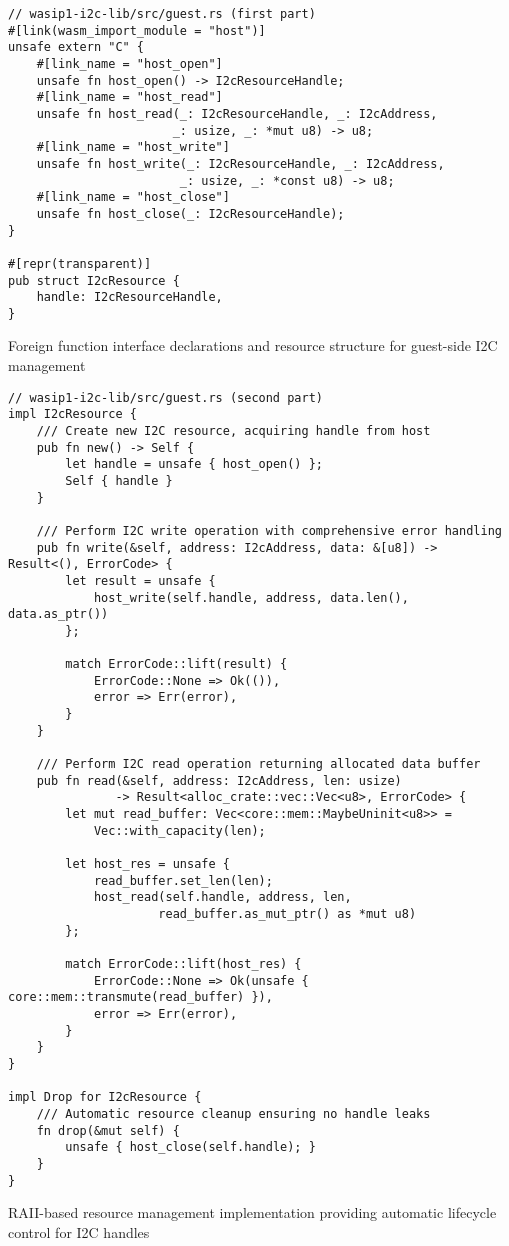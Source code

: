 \begin{listing}[H]
\begin{verbatim}
// wasip1-i2c-lib/src/guest.rs (first part)
#[link(wasm_import_module = "host")]
unsafe extern "C" {
    #[link_name = "host_open"]
    unsafe fn host_open() -> I2cResourceHandle;
    #[link_name = "host_read"]
    unsafe fn host_read(_: I2cResourceHandle, _: I2cAddress, 
                       _: usize, _: *mut u8) -> u8;
    #[link_name = "host_write"]
    unsafe fn host_write(_: I2cResourceHandle, _: I2cAddress, 
                        _: usize, _: *const u8) -> u8;
    #[link_name = "host_close"]
    unsafe fn host_close(_: I2cResourceHandle);
}

#[repr(transparent)]
pub struct I2cResource {
    handle: I2cResourceHandle,
}
\end{verbatim}
\caption{Foreign function interface declarations and resource structure for guest-side I2C management}
\label{lst:guest-ffi-declarations}
\end{listing}

\begin{listing}[H]
\begin{verbatim}
// wasip1-i2c-lib/src/guest.rs (second part)
impl I2cResource {
    /// Create new I2C resource, acquiring handle from host
    pub fn new() -> Self {
        let handle = unsafe { host_open() };
        Self { handle }
    }

    /// Perform I2C write operation with comprehensive error handling
    pub fn write(&self, address: I2cAddress, data: &[u8]) -> Result<(), ErrorCode> {
        let result = unsafe {
            host_write(self.handle, address, data.len(), data.as_ptr())
        };
        
        match ErrorCode::lift(result) {
            ErrorCode::None => Ok(()),
            error => Err(error),
        }
    }

    /// Perform I2C read operation returning allocated data buffer
    pub fn read(&self, address: I2cAddress, len: usize) 
               -> Result<alloc_crate::vec::Vec<u8>, ErrorCode> {
        let mut read_buffer: Vec<core::mem::MaybeUninit<u8>> = 
            Vec::with_capacity(len);

        let host_res = unsafe {
            read_buffer.set_len(len);
            host_read(self.handle, address, len, 
                     read_buffer.as_mut_ptr() as *mut u8)
        };

        match ErrorCode::lift(host_res) {
            ErrorCode::None => Ok(unsafe { core::mem::transmute(read_buffer) }),
            error => Err(error),
        }
    }
}

impl Drop for I2cResource {
    /// Automatic resource cleanup ensuring no handle leaks
    fn drop(&mut self) {
        unsafe { host_close(self.handle); }
    }
}
\end{verbatim}
\caption{RAII-based resource management implementation providing automatic lifecycle control for I2C handles}
\label{lst:guest-resource-management}
\end{listing}

